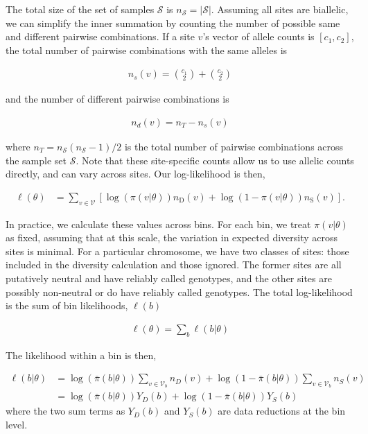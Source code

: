 \documentclass[11pt]{article}
\begin{document}
The total size of the set of samples $\mathcal{S}$ is $n_\mathcal{S} =
|\mathcal{S}|$. Assuming all sites are biallelic, we can simplify the inner
summation by counting the number of possible same and different pairwise
combinations. If a site $v$'s vector of allele counts is $[c_1, c_2]$, the
total number of pairwise combinations with the same alleles is

\begin{align}
  n_s(v) = {c_1 \choose 2} + {c_2 \choose 2}
\end{align}

and the number of different pairwise combinations is 

\begin{align}
  n_d(v) = n_T - n_s(v)
\end{align}

where $n_T = n_\mathcal{S} (n_\mathcal{S} - 1) / 2$  is the total number of
pairwise combinations across the sample set $\mathcal{S}$. Note that these
site-specific counts allow us to use allelic counts directly, and can vary
across sites. Our log-likelihood is then,

\begin{align}
  \ell(\theta) &= \sum_{v \in \mathcal{V}} \left[\log(\pi(v | \theta)) n_\text{D}(v) + \log(1-\pi(v | \theta)) n_\text{S}(v)\right].
\end{align}

In practice, we calculate these values across bins. For each bin, we treat
$\pi(v | \theta)$ as fixed, assuming that at this scale, the variation in
expected diversity across sites is minimal. For a particular chromosome, we
have two classes of sites: those included in the diversity calculation and
those ignored. The former sites are all putatively neutral and have reliably
called genotypes, and the other sites are possibly non-neutral or do have
reliably called genotypes. The total log-likelihood is the sum of bin likelihoods,
$\ell(b)$

\begin{align}
   \ell(\theta) =  \sum_b \ell(b | \theta)
\end{align}

The likelihood within a bin is then,

\begin{align}
  \ell(b | \theta)  &= \log(\bar{\pi}(b | \theta)) \sum_{v \in \mathcal{V}_b} n_D(v) + \log(1-\bar{\pi}(b | \theta)) \sum_{v \in \mathcal{V}_b} n_S(v)  \\
                               &= \log(\bar{\pi}(b | \theta)) Y_D(b) + \log(1-\bar{\pi}(b | \theta)) Y_S(b)
\end{align}
%
where the two sum terms as $Y_D(b)$ and $Y_S(b)$ are data reductions at the bin
level.
\end{document}
